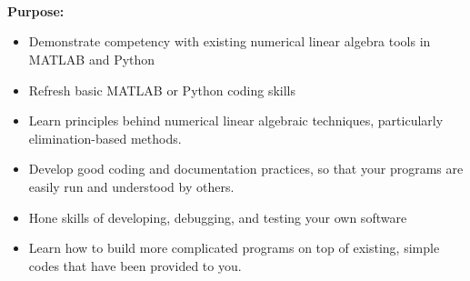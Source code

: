 \documentclass{article}
\begin{document}
~\\~\\~\\
\textbf{Purpose:}  
\begin{itemize}
  \item Demonstrate competency with existing numerical linear algebra tools in MATLAB and Python
  \item Refresh basic MATLAB or Python coding skills
  \item Learn principles behind numerical linear algebraic techniques, particularly elimination-based methods.  
  \item Develop good coding and documentation practices, so that your programs are easily run and understood by others.  
  \item Hone skills of developing, debugging, and testing your own software
  \item Learn how to build more complicated programs on top of existing, simple codes that have been provided to you.
\end{itemize}

\pagebreak
\end{document}

